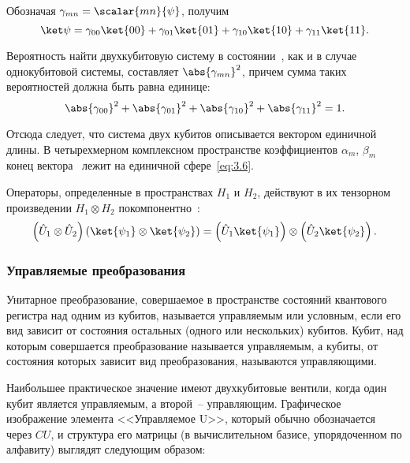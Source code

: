 \documentclass[pscyr,notitlepage]{hedwork}
\newcommand{\eq}[1]{\eqref{eq:#1}}
\renewcommand{\~}[1]{\widetilde{#1}}
\newcommand{\lb}{\left(}
\newcommand{\rb}{\right)}
\begin{document}
  Обозначая \( \gamma_{mn} = \scalar{mn}{\psi} \), получим
  \begin{equation}
    \ket\psi = \gamma_{00}\ket{00} + \gamma_{01}\ket{01} +
      \gamma_{10}\ket{10} + \gamma_{11}\ket{11}.
    \label{eq:3.6}
  \end{equation}
  
  Вероятность найти двухкубитовую систему в состоянии~, как и в случае
  однокубитовой системы, составляет \( \abs{\gamma_{mn}}^2 \), причем сумма
  таких вероятностей должна быть равна единице:
  \[
    \abs{\gamma_{00}}^2 + \abs{\gamma_{01}}^2 + \abs{\gamma_{10}}^2 +
      \abs{\gamma_{11}}^2 = 1.
  \]
  
  Отсюда следует, что система двух кубитов описывается вектором единичной
  длины. В четырехмерном комплексном пространстве коэффициентов \( \alpha_m \),
  \( \beta_m \) конец вектора~\ket{\psi} лежит на единичной сфере~\eq{3.6}.
  
  Операторы, определенные в пространствах \( H_1 \) и \( H_2 \), действуют в
  их тензорном произведении \( H_1\otimes H_2 \) покомпонентно~\cite{main,task}:
  \[
    \lb\hat{U}_1\otimes\hat{U}_2\rb
      \lb\ket{\psi_1}\otimes\ket{\psi_2}\rb =
      \lb\hat{U}_1\ket{\psi_1}\rb \otimes
      \lb\hat{U}_2\ket{\psi_2}\rb.
  \]
  
  \subsubsection{Управляемые преобразования}
  
  Унитарное преобразование, совершаемое в пространстве состояний квантового
  регистра над одним из кубитов, называется управляемым или условным, если
  его вид зависит от состояния остальных (одного или нескольких) кубитов.
  Кубит, над которым совершается преобразование называется управляемым, а
  кубиты, от состояния которых зависит вид преобразования, называются
  управляющими.
  
  Наибольшее практическое значение имеют двухкубитовые вентили, когда один
  кубит является управляемым, а второй~-- управляющим. Графическое
  изображение элемента <<Управляемое U>>, который обычно обозначается
  через \( CU \), и структура его матрицы (в вычислительном базисе,
  упорядоченном по алфавиту) выглядят следующим образом:
  
\end{document}
